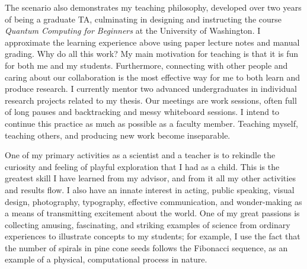 \documentclass{article}
\begin{document}
The scenario also demonstrates
my teaching philosophy, developed over two years of being a graduate TA,
culminating in designing and instructing the course
\emph{Quantum Computing for Beginners}
at the University of Washington. I approximate the learning experience
above using paper lecture notes and manual grading.
Why do all this work? My main motivation for teaching is that
it is fun for both me and my students. Furthermore, connecting with other
people and caring about our collaboration is the 
most effective way for me to both learn and produce research. I currently
mentor two advanced undergraduates in individual research projects related to
my thesis. Our meetings are work sessions, often full of long pauses and
backtracking and messy whiteboard sessions. I intend to continue this
practice as much as
possible as a faculty member.
Teaching myself, teaching others, and producing new work become inseparable.

One of my primary activities as a scientist and a teacher is to rekindle the curiosity
and feeling of playful exploration that I had as a child.
This is the greatest skill I have learned
from my advisor, and from it all my other activities and results flow.
I also have an innate interest in acting, public speaking, visual
design, photography, typography, effective communication, and wonder-making
as a means of transmitting excitement about the world. One of my great passions
is collecting amusing, fascinating, and striking examples of science
from ordinary experiences to illustrate concepts to my students; for example,
I use the fact that the number of spirals in pine cone seeds follows the
Fibonacci sequence, as an example of a physical, computational process in nature.


\end{document}
